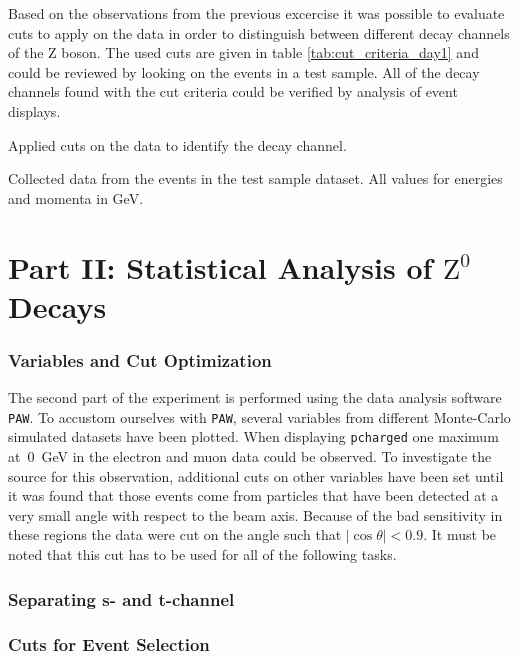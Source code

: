 \documentclass[11pt, a4paper]{article}
\numberwithin{equation}{section}
\begin{document}
Based on the observations from the previous excercise it was possible to evaluate cuts to apply on the data in order to distinguish between different decay channels of the Z boson.
The used cuts are given in table \ref{tab:cut_criteria_day1} and could be reviewed by looking on the events in a test sample.
All of the decay channels found with the cut criteria could be verified by analysis of event displays.
\begin{table}[h]
	\centering
	
	\caption{Applied cuts on the data to identify the decay channel.}
	\label{tab:cut_criteria_day1}
\end{table}
\begin{table}[h]
	\centering
	\resizebox{\textwidth}{!}{
		
	}
	\caption{Collected data from the events in the test sample dataset. All values for energies and momenta in \si{GeV}.}
\end{table}

\clearpage
\section{Part II: Statistical Analysis of $\mathrm{Z}^0$ Decays}

\subsubsection{Variables and Cut Optimization}
The second part of the experiment is performed using the data analysis software \texttt{PAW}.
To accustom ourselves with \texttt{PAW}, several variables from different Monte-Carlo simulated datasets have been plotted.
When displaying \texttt{pcharged} one maximum at~\SI{0}{GeV} in the electron and muon data could be observed.
To investigate the source for this observation, additional cuts on other variables have been set until it was found that those events come from particles that have been detected at a very small angle with respect to the beam axis.
Because of the bad sensitivity in these regions the data were cut on the angle such that $\left|\cos\theta\right|<\num{0.9}$.
It must be noted that this cut has to be used for all of the following tasks.

\subsubsection{Separating s- and t-channel}

\subsubsection{Cuts for Event Selection}
\end{document}
